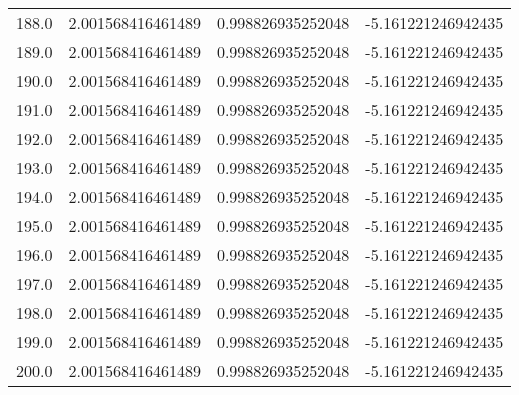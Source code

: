 \begin{longtable}{lrrr}
188.0 & 2.001568416461489 & 0.998826935252048 & -5.161221246942435 \\
189.0 & 2.001568416461489 & 0.998826935252048 & -5.161221246942435 \\
190.0 & 2.001568416461489 & 0.998826935252048 & -5.161221246942435 \\
191.0 & 2.001568416461489 & 0.998826935252048 & -5.161221246942435 \\
192.0 & 2.001568416461489 & 0.998826935252048 & -5.161221246942435 \\
193.0 & 2.001568416461489 & 0.998826935252048 & -5.161221246942435 \\
194.0 & 2.001568416461489 & 0.998826935252048 & -5.161221246942435 \\
195.0 & 2.001568416461489 & 0.998826935252048 & -5.161221246942435 \\
196.0 & 2.001568416461489 & 0.998826935252048 & -5.161221246942435 \\
197.0 & 2.001568416461489 & 0.998826935252048 & -5.161221246942435 \\
198.0 & 2.001568416461489 & 0.998826935252048 & -5.161221246942435 \\
199.0 & 2.001568416461489 & 0.998826935252048 & -5.161221246942435 \\
200.0 & 2.001568416461489 & 0.998826935252048 & -5.161221246942435 \\
\end{longtable}